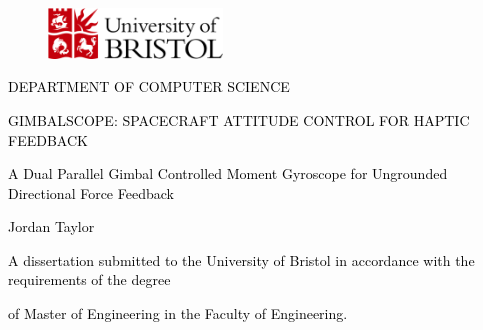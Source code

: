\documentclass[a4paper]{article}
\title{}
\author{Jordan Taylor}
\date{2023-03-25}
\begin{document}
\clearpage\setcounter{page}{1}\pagestyle{Standard}

\bigskip


\bigskip



\begin{figure}
\centering
\includegraphics[width=4.625cm,height=1.342cm]{Gimbalscope20Dissertation20PreTex-img001.png}
\end{figure}

\bigskip


\bigskip


\bigskip


\bigskip

{\centering
\textcolor{black}{DEPARTMENT OF COMPUTER SCIENCE}
\par}


\bigskip


\bigskip


\bigskip

{\centering
\textcolor{black}{GIMBALSCOPE: SPACECRAFT ATTITUDE CONTROL FOR HAPTIC FEEDBACK}
\par}

{\centering
\textcolor{black}{A Dual Parallel Gimbal Controlled Moment Gyroscope for Ungrounded Directional Force Feedback}
\par}


\bigskip


\bigskip


\bigskip

{\centering
\textcolor{black}{Jordan Taylor}
\par}


\bigskip


\bigskip


\bigskip


\bigskip

{\par}

\bigskip

{\centering
\textcolor{black}{A dissertation submitted to the University of Bristol in accordance with the requirements of the
degree}
\par}

{\centering
\textcolor{black}{of Master of Engineering in the Faculty of Engineering.}
\par}
\end{document}
